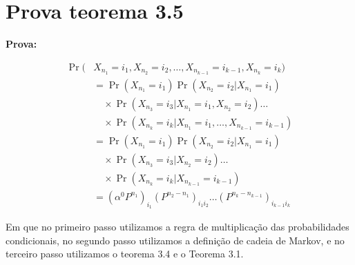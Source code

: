 \documentclass[12pt, a4paper, openany]{book}
\numberwithin{equation}{chapter}
\numberwithin{table}{chapter}
\numberwithin{figure}{chapter}
\theoremstyle{break}
\begin{document}
\section{Prova teorema 3.5}



\textbf{Prova:}



\begin{align*}
    \Pr(&X_{n_1} = i_1, X_{n_2} = i_2, \dots, X_{n_{k-1}} = i_{k-1}, X_{n_k} = i_k) \\
    &= \Pr(X_{n_1} = i_1) \Pr(X_{n_2} = i_2 | X_{n_1} = i_1) \\
    &\quad \times \Pr(X_{n_3} = i_3 | X_{n_1} = i_1, X_{n_2} = i_2) \dots \\
    &\quad \times \Pr(X_{n_k} = i_k | X_{n_1} = i_1, \dots, X_{n_{k-1}} = i_{k-1}) \\
    &= \Pr(X_{n_1} = i_1) \Pr(X_{n_2} = i_2 | X_{n_1} = i_1) \\
    &\quad \times \Pr(X_{n_3} = i_3 | X_{n_2} = i_2) \dots \\
    &\quad \times \Pr(X_{n_k} = i_k | X_{n_{k-1}} = i_{k-1}) \\
    &= (\alpha^0 P^{n_1})_{i_1} (P^{n_2 - n_1})_{i_1 i_2} \dots (P^{n_k - n_{k-1}})_{i_{k-1} i_k}
\end{align*}


Em que no primeiro passo utilizamos a regra de multiplicação das probabilidades condicionais, no segundo passo utilizamos a definição de cadeia de Markov, e no terceiro passo utilizamos o teorema 3.4 e o Teorema 3.1.



\backmatter
\clearpage
\printbibliography
\end{document}
